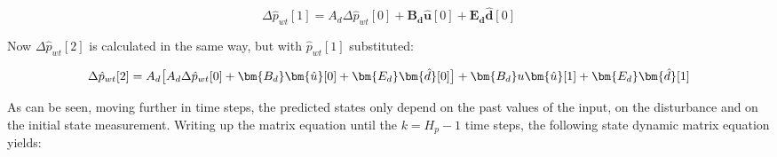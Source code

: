 
\begin{equation}
	\Delta \hat p_{wt}[1] = A_d\Delta \hat p_{wt}[0] + \bm{B_d} \bm{\hat{u}}[0] + \bm{E_d} \bm{\hat{d}}[0]
\end{equation}

Now $\Delta \hat p_{wt}[2]$ is calculated in the same way, but with $\hat p_{wt}[1]$ substituted: 

\begin{equation}
	\Delta \hat p_{wt}[2] = A_d\big[A_d\Delta \hat p_{wt}[0] + \bm{B_d}  \bm{\hat{u}}[0] + \bm{E_d}  \bm{\hat{d}}[0]\big] + \bm{B_d} u\bm{\hat{u}}[1] + \bm{E_d} \bm{\hat{d}}[1]\\ 
\end{equation}

As can be seen, moving further in time steps, the predicted states only depend on the past values of the input, on the disturbance and on the initial state measurement. Writing up the matrix equation until the $k = H_p - 1$ time steps, the following state dynamic matrix equation yields:

